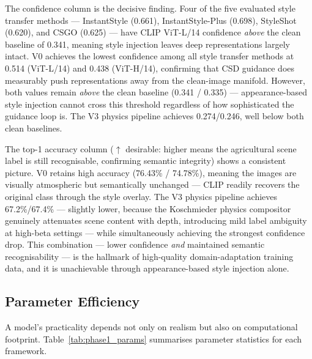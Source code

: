 \noindent The confidence column is the decisive finding.
Four of the five evaluated style transfer methods --- InstantStyle (0.661), InstantStyle-Plus (0.698), StyleShot (0.620), and CSGO (0.625) --- have CLIP ViT-L/14 confidence \emph{above} the clean baseline of 0.341, meaning style injection leaves deep representations largely intact.
V0 achieves the lowest confidence among all style transfer methods at 0.514 (ViT-L/14) and 0.438 (ViT-H/14), confirming that CSD guidance does measurably push representations away from the clean-image manifold.
However, both values remain \emph{above} the clean baseline (0.341 / 0.335) --- appearance-based style injection cannot cross this threshold regardless of how sophisticated the guidance loop is.
The V3 physics pipeline achieves 0.274/0.246, well below both clean baselines.

\noindent The top-1 accuracy column ($\uparrow$ desirable: higher means the agricultural scene label is still recognisable, confirming semantic integrity) shows a consistent picture.
V0 retains high accuracy (76.43\% / 74.78\%), meaning the images are visually atmospheric but semantically unchanged --- CLIP readily recovers the original class through the style overlay.
The V3 physics pipeline achieves 67.2\%/67.4\% --- slightly lower, because the Koschmieder physics compositor genuinely attenuates scene content with depth, introducing mild label ambiguity at high-beta settings --- while simultaneously achieving the strongest confidence drop.
This combination --- lower confidence \emph{and} maintained semantic recognisability --- is the hallmark of high-quality domain-adaptation training data, and it is unachievable through appearance-based style injection alone.

\subsection{Parameter Efficiency}
\label{sec:parameter_efficiency}

\noindent A model's practicality depends not only on realism but also on computational footprint.
Table~\ref{tab:phase1_params} summarises parameter statistics for each framework.

